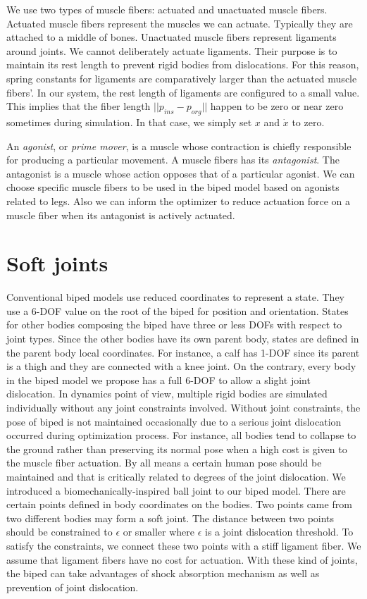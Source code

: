 \documentclass[master,english,final]{kaist-ucs}
\begin{document}
We use two types of muscle fibers: actuated and unactuated muscle fibers.
Actuated muscle fibers represent the muscles we can actuate. Typically
they are attached to a middle of bones. Unactuated muscle fibers represent
ligaments around joints. We cannot deliberately actuate ligaments. Their
purpose is to maintain its rest length to prevent rigid bodies from
dislocations. For this reason, spring constants for ligaments are
comparatively larger than the actuated muscle fibers'.
In our system, the rest length of ligaments are configured to a small value.
This implies that the fiber length $||p_{ins}-p_{org}||$ happen to be zero
or near zero sometimes during simulation. In that case, we simply set
$x$ and $\dot{x}$ to zero.

An \emph{agonist}, or \emph{prime mover}, is a muscle whose contraction is chiefly responsible for producing a particular movement.
A muscle fibers has its \emph{antagonist}. The antagonist is a muscle whose action opposes that of a particular agonist.
We can choose specific muscle fibers to be used in the biped model based on agonists related to legs.
Also we can inform the optimizer to reduce actuation force on a muscle fiber when its antagonist is actively actuated.
\pagebreak


\section{Soft joints}

Conventional biped models use reduced coordinates to represent a state.
They use a 6-DOF value on the root of the biped for position and orientation.
States for other bodies composing the biped have three or less DOFs with respect to joint types.
Since the other bodies have its own parent body, states are defined in the parent body local coordinates.
For instance, a calf has 1-DOF since its parent is a thigh and they are connected with a knee joint.
On the contrary, every body in the biped model we propose has a full 6-DOF to allow a slight joint dislocation.
In dynamics point of view, multiple rigid bodies are simulated individually without any joint constraints involved.
Without joint constraints, the pose of biped is not maintained occasionally due to a serious joint dislocation occurred during optimization process.
For instance, all bodies tend to collapse to the ground rather than preserving its normal pose when a high cost is given to the muscle fiber actuation.
By all means a certain human pose should be maintained and that is critically related to degrees of the joint dislocation.
We introduced a biomechanically-inspired ball joint to our biped model.
There are certain points defined in body coordinates on the bodies.
Two points came from two different bodies may form a soft joint.
The distance between two points should be constrained to $\epsilon$ or smaller where $\epsilon$ is a joint dislocation threshold.
To satisfy the constraints, we connect these two points with a stiff ligament fiber.
We assume that ligament fibers have no cost for actuation.
With these kind of joints, the biped can take advantages of shock absorption mechanism as well as prevention of joint dislocation.
\end{document}
